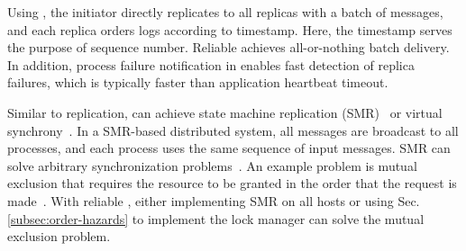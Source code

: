 Using \sys{}, the initiator directly replicates to all replicas with a batch of messages, and each replica orders logs according to timestamp. Here, the timestamp serves the purpose of sequence number. Reliable \sys{} achieves all-or-nothing batch delivery.
In addition, process failure notification in \sys{} enables fast detection of replica failures, which is typically faster than application heartbeat timeout.

Similar to replication, \sys{} can achieve state machine replication (SMR)~\cite{lamport1978time} or virtual synchrony~\cite{birman1987exploiting}. In a SMR-based distributed system, all messages are broadcast to all processes, and each process uses the same sequence of input messages.
SMR can solve arbitrary synchronization problems~\cite{lamport1978time}. An example problem is mutual exclusion that requires the resource to be granted in the order that the request is made~\cite{lamport1978time}.
With reliable \sys{}, either implementing SMR on all hosts or using Sec.\ref{subsec:order-hazards} to implement the lock manager can solve the mutual exclusion problem.

